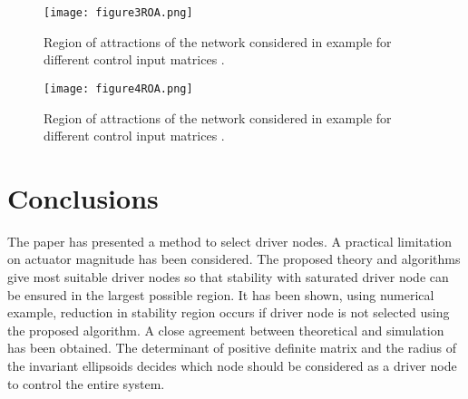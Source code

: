 \documentclass[conference]{IEEEtran}
\begin{document}
\begin{figure}[!hbtp]
 	\centering
 	\texttt{[image: figure3ROA.png]}
 	\captionsetup{format=plain,justification=raggedright}
 	\caption{Region of attractions of the network considered in example  for different control input matrices .}
 			\label{fig:3}
 	\end{figure}

 	\begin{figure}[!hbtp]
 	\centering
 	\texttt{[image: figure4ROA.png]}
 	\captionsetup{format=plain,justification=raggedright}
 	\caption{Region of attractions of the network considered in example  for different control input matrices .}
 								\label{fig:5}
 	\end{figure}

\section{Conclusions}
 The paper has presented a method to select driver nodes. A practical limitation on actuator magnitude has been considered. The proposed theory and algorithms give most suitable driver nodes so that stability with saturated driver node can be ensured in the largest possible region. It has been shown, using numerical example,  reduction in stability region occurs if driver node is not selected using the proposed algorithm. A close agreement between theoretical and simulation has been obtained. The determinant of positive definite matrix  and the radius of the invariant ellipsoids decides which node should be considered as a driver node to control the entire system.


















\end{document}
